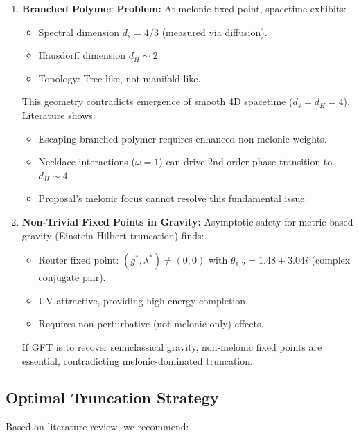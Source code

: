 \documentclass[12pt,a4paper]{article}
\begin{document}
\begin{enumerate}
\item \textbf{Branched Polymer Problem:} At melonic fixed point, spacetime exhibits:
\begin{itemize}
\item Spectral dimension \(d_s = 4/3\) (measured via diffusion).
\item Hausdorff dimension \(d_H \sim 2\).
\item Topology: Tree-like, not manifold-like.
\end{itemize}

This geometry contradicts emergence of smooth 4D spacetime (\(d_s = d_H = 4\)). Literature shows:
\begin{itemize}
\item Escaping branched polymer requires enhanced non-melonic weights.
\item Necklace interactions (\(\omega=1\)) can drive 2nd-order phase transition to \(d_H \sim 4\).
\item Proposal's melonic focus cannot resolve this fundamental issue.
\end{itemize}

\item \textbf{Non-Trivial Fixed Points in Gravity:} Asymptotic safety for metric-based gravity (Einstein-Hilbert truncation) finds:
\begin{itemize}
\item Reuter fixed point: \((g^*, \lambda^*) \neq (0, 0)\) with \(\theta_{1,2} = 1.48 \pm 3.04i\) (complex conjugate pair).
\item UV-attractive, providing high-energy completion.
\item Requires non-perturbative (not melonic-only) effects.
\end{itemize}

If GFT is to recover semiclassical gravity, non-melonic fixed points are essential, contradicting melonic-dominated truncation.
\end{enumerate}

\subsection{Optimal Truncation Strategy}

Based on literature review, we recommend:
\end{document}
